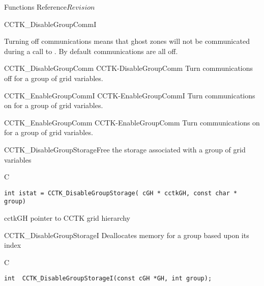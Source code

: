 \begin{cactuspart}{ Functions Reference}{}{$Revision$}
\begin{FunctionDescription}{CCTK\_DisableGroupCommI}
\begin{Discussion}
Turning off communications means that ghost zones will not be
communicated during a call to . By default
communications are all off.
\end{Discussion}

\begin{SeeAlsoSection}
\begin{SeeAlso2} {CCTK\_DisableGroupComm} {CCTK-DisableGroupComm}
Turn communications off for a group of grid variables.
\end{SeeAlso2}
\begin{SeeAlso2} {CCTK\_EnableGroupCommI} {CCTK-EnableGroupCommI}
Turn communications on for a group of grid variables.
\end{SeeAlso2}
\begin{SeeAlso2} {CCTK\_EnableGroupComm} {CCTK-EnableGroupComm}
Turn communications on for a group of grid variables.
\end{SeeAlso2}
\end{SeeAlsoSection}

\end{FunctionDescription}

\begin{FunctionDescription}{CCTK\_DisableGroupStorage}{Free the storage associated with a group of grid variables}
\label{CCTK-DisableGroupStorage}
\begin{SynopsisSection}
\begin{Synopsis}{C}
\begin{verbatim}int istat = CCTK_DisableGroupStorage( cGH * cctkGH, const char * group)\end{verbatim}
\end{Synopsis}
\end{SynopsisSection}
\begin{ParameterSection}
\begin{Parameter}{cctkGH}
pointer to CCTK grid hierarchy
\end{Parameter}
\end{ParameterSection}
\end{FunctionDescription}

\begin{FunctionDescription}{CCTK\_DisableGroupStorageI}
\label{CCTK-DisableGroupStorageI}
Deallocates memory for a group based upon its index
\begin{SynopsisSection}
\begin{Synopsis}{C}
\begin{verbatim}int  CCTK_DisableGroupStorageI(const cGH *GH, int group);\end{verbatim}
\end{Synopsis}
\end{SynopsisSection}


\end{FunctionDescription}
\end{cactuspart}
